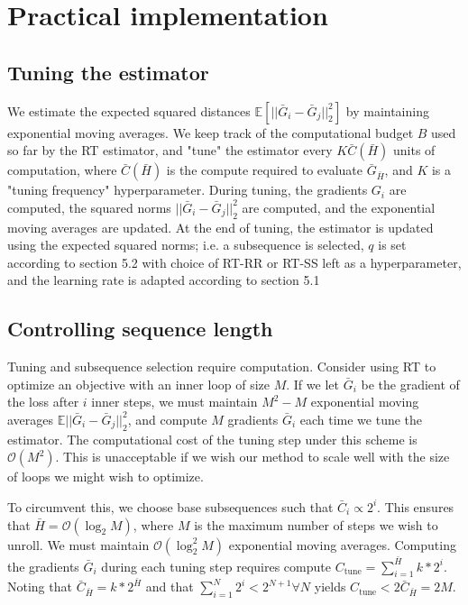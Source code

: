 \section{Practical implementation}
\subsection{Tuning the estimator}
We estimate the expected squared distances
$\mathbb{E}[||\bar{G}_i - \bar{G}_j||_2^2]$ by
maintaining exponential moving averages. We keep track of the computational
budget $B$ used so far by the RT estimator, and "tune" the estimator
every $K \bar{C}(\bar{H})$ units of computation, where
$\bar{C}(\bar{H})$ is the compute required to
evaluate $\bar{G}_{\bar{H}}$, and $K$ is a "tuning frequency" hyperparameter.
During tuning, the gradients $G_i$ are computed, the squared norms
$||\bar{G}_i - \bar{G}_j||_2^2$ are computed, and the exponential moving averages
are updated. At the end of tuning, the estimator is updated using the
expected squared norms; i.e. a subsequence is selected, $q$ is set according
to section 5.2 with choice of RT-RR or RT-SS left as a hyperparameter, and
the learning rate is adapted according to section 5.1

\subsection{Controlling sequence length}
Tuning and subsequence selection require computation. Consider using RT
to optimize an objective with an inner loop of size $M$.
If we let $\bar{G}_i$
be the gradient of the loss after $i$ inner steps,
we must maintain $M^2 - M$ exponential moving
averages $\mathbb{E}||\bar{G}_i - \bar{G}_j||_2^2$, and
compute $M$ gradients $\bar{G}_i$ each time we tune the estimator.
The computational cost of the tuning step under this
scheme is $\mathcal{O}(M^2)$.
This is unacceptable if we wish our method to scale well
with the size of loops we might wish to optimize.

To circumvent this, we choose base subsequences such that
$\bar{C}_i \propto 2^i$. This ensures that
$\bar{H} = \mathcal{O}(\log_2 M)$, where $M$ is the maximum number of steps we
wish to unroll. We must maintain $\mathcal{O} (\log_2^2 M)$ exponential moving
averages. Computing the gradients $\bar{G}_i$ during each tuning step
requires compute $C_{\text{tune}} = \sum_{i=1}^{\bar{H}} k * 2^i$. Noting
that $\bar{C}_{\bar{H}} = k * 2^{\bar{H}}$ and that
$\sum_{i=1}^N 2^i < 2^{N+1} \forall N$ yields
$C_{\text{tune}} < 2 \bar{C}_{\bar{H}} = 2 M$.
